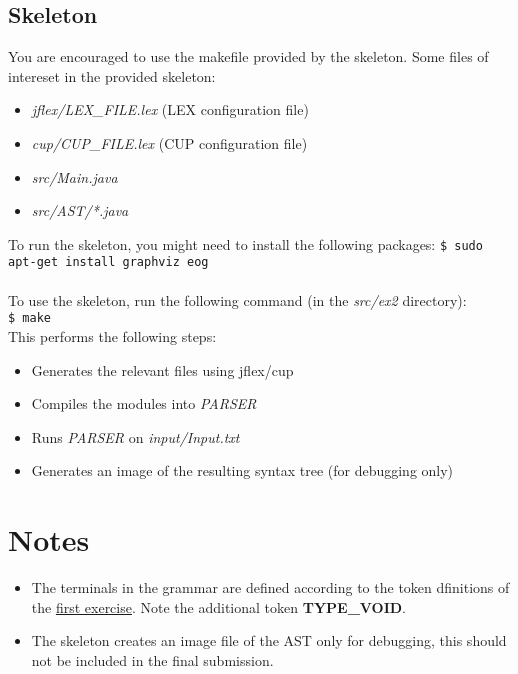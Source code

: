 \documentclass{article}
\begin{document}
\subsection{Skeleton}
You are encouraged to use the makefile provided by the skeleton.
Some files of intereset in the provided skeleton:
\begin{itemize}
    \item \textit{jflex/LEX\_FILE.lex} (LEX configuration file)
    \item \textit{cup/CUP\_FILE.lex} (CUP configuration file)
    \item \textit{src/Main.java}
    \item \textit{src/AST/*.java}
\end{itemize}
To run the skeleton, you might need to install the following packages:
\texttt{\$ sudo apt-get install graphviz eog} \\ \\
To use the skeleton, run the following command (in the \textit{src/ex2} directory): \\
\texttt{\$ make} \\
This performs the following steps:
\begin{itemize}
    \item Generates the relevant files using jflex/cup
    \item Compiles the modules into \textit{PARSER}
    \item Runs \textit{PARSER} on \textit{input/Input.txt}
    \item Generates an image of the resulting syntax tree (for debugging only)
\end{itemize}

\section{Notes}
\begin{itemize}
\item
The terminals in the grammar are defined according to the token dfinitions of the
\href{https://github.com/davidtr1037/compilation-tau/blob/master/exercises/ex1/ex1.pdf}{first exercise}.
Note the additional token \textbf{TYPE\_VOID}.
\item
The skeleton creates an image file of the AST only for debugging,
this should not be included in the final submission.
\end{itemize}
\end{document}
